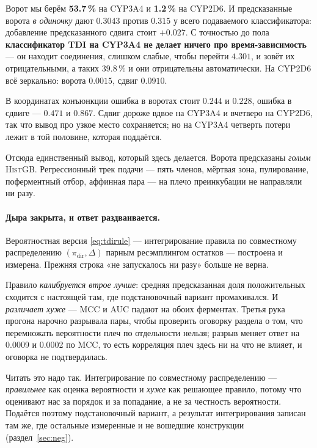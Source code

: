 Ворот мы берём \textbf{53.7\,\%} на CYP3A4 и \textbf{1.2\,\%} на CYP2D6. И предсказанные ворота
\emph{в одиночку} дают $0.3043$ против $0.315$ у всего подаваемого классификатора: добавление
предсказанного сдвига стоит $+0.027$. С точностью до пола \textbf{классификатор TDI на CYP3A4 не
делает ничего про время-зависимость} --- он находит соединения, слишком слабые, чтобы перейти
$4.301$, и зовёт их отрицательными, а таких $39.8\,\%$ и они отрицательны автоматически. На CYP2D6
всё зеркально: ворота $0.0015$, сдвиг $0.0910$.

В координатах конъюнкции ошибка в воротах стоит $0.244$ и $0.228$, ошибка в сдвиге --- $0.471$ и
$0.867$. Сдвиг дороже вдвое на CYP3A4 и вчетверо на CYP2D6, так что вывод про узкое место
сохраняется; но на CYP3A4 четверть потери лежит в той половине, которая поддаётся.

Отсюда единственный вывод, который здесь делается. Ворота предсказаны \emph{голым} \textsc{HistGB}.
Регрессионный трек подачи --- пять членов, мёртвая зона, пулирование, поферментный отбор, аффинная
пара --- на плечо преинкубации не направляли ни разу.

\paragraph{Дыра закрыта, и ответ раздваивается.} Вероятностная версия \eqref{eq:tdirule} ---
интегрирование правила по совместному распределению $(\pi_{\text{dir}}, \Delta)$ парным ресэмплингом
остатков --- построена и измерена. Прежняя строка «не запускалось ни разу» больше не верна.

Правило \emph{калибруется втрое лучше}: средняя предсказанная доля положительных сходится с настоящей
там, где подстановочный вариант промахивался. И \emph{различает хуже} --- MCC и AUC падают на обоих
ферментах. Третья рука прогона нарочно разрывала пары, чтобы проверить оговорку раздела о том, что
перемножать вероятности плеч по отдельности нельзя; разрыв меняет ответ на 0.0009 и 0.0002 по MCC, то
есть корреляция плеч здесь ни на что не влияет, и оговорка не подтвердилась.

Читать это надо так. Интегрирование по совместному распределению --- \emph{правильнее} как оценка
вероятности и \emph{хуже} как решающее правило, потому что оценивают нас за порядок и за попадание, а
не за честность вероятности. Подаётся поэтому подстановочный вариант, а результат интегрирования
записан там же, где остальные измеренные и не вошедшие конструкции (раздел~\ref{sec:neg}).
